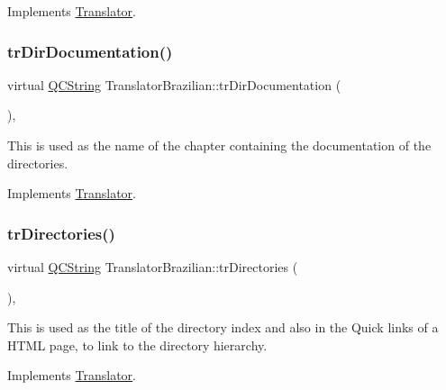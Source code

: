 Implements \mbox{\hyperlink{class_translator}{Translator}}.

\mbox{\label{class_translator_brazilian_a6c75205b9ca14d5a5ec236ff24951de7}} 
\subsubsection{\texorpdfstring{trDirDocumentation()}{trDirDocumentation()}}
{\footnotesize\ttfamily virtual \mbox{\hyperlink{class_q_c_string}{Q\+C\+String}} Translator\+Brazilian\+::tr\+Dir\+Documentation (\begin{DoxyParamCaption}{ }\end{DoxyParamCaption})\hspace{0.3cm}{\ttfamily [inline]}, {\ttfamily [virtual]}}

This is used as the name of the chapter containing the documentation of the directories. 

Implements \mbox{\hyperlink{class_translator}{Translator}}.

\mbox{\label{class_translator_brazilian_a9acdea5cd28e992665f5373dd8c57c96}} 
\subsubsection{\texorpdfstring{trDirectories()}{trDirectories()}}
{\footnotesize\ttfamily virtual \mbox{\hyperlink{class_q_c_string}{Q\+C\+String}} Translator\+Brazilian\+::tr\+Directories (\begin{DoxyParamCaption}{ }\end{DoxyParamCaption})\hspace{0.3cm}{\ttfamily [inline]}, {\ttfamily [virtual]}}

This is used as the title of the directory index and also in the Quick links of a H\+T\+ML page, to link to the directory hierarchy. 

Implements \mbox{\hyperlink{class_translator}{Translator}}.

\mbox{\label{class_translator_brazilian_a2b01db0daef203ba2ccb53711066ef42}} 
